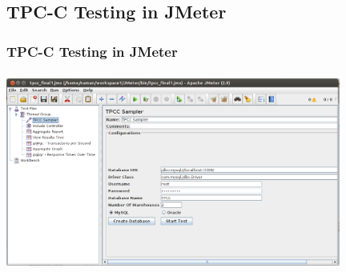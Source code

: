 \documentclass[12pt]{beamer}
\begin{document}
\subsection{TPC-C Testing in JMeter}
\begin{frame}[c]
\frametitle{TPC-C Testing in JMeter}

\centering
   \includegraphics[width=11cm, height=6.5cm]{images/tpccgui1}

\end{frame}


\end{document}
